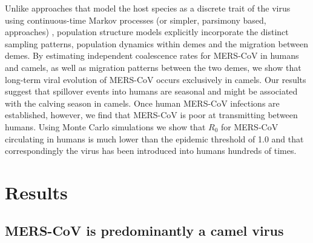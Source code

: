 \documentclass[11pt,oneside,letterpaper]{article}
\begin{document}
Unlike approaches that model the host species as a discrete trait of the virus using continuous-time Markov processes (or simpler, parsimony based, approaches) %
\citep{faria_simultaneously_2013,global_consortium_for_h5n8_and_related_influenza_viruses_role_2016}, population structure models explicitly incorporate the distinct sampling patterns, population dynamics within demes and the migration between demes.
By estimating independent coalescence rates for MERS-CoV in humans and camels, as well as migration patterns between the two demes, we show that long-term viral evolution of MERS-CoV occurs exclusively in camels.
Our results suggest that spillover events into humans are seasonal and might be associated with the calving season in camels.
Once human MERS-CoV infections are established, however, we find that MERS-CoV is poor at transmitting between humans.
Using Monte Carlo simulations we show that $R_{0}$ for MERS-CoV circulating in humans is much lower than the epidemic threshold of 1.0 and that correspondingly the virus has been introduced into humans hundreds of times.

%

\section*{Results}

\subsection*{MERS-CoV is predominantly a camel virus}
\end{document}
